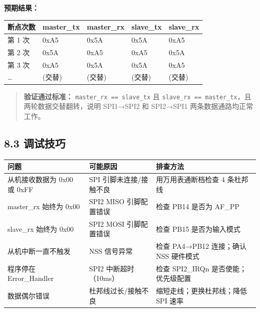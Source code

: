 \documentclass[
  chinese,
  UTF8,
  oneside,
  openany]{ctexbook}
\begin{document}
\textbf{预期结果：}

\begin{longtable}[]{@{}lllll@{}}
\toprule\noalign{}
断点次数 & master\_tx & master\_rx & slave\_tx & slave\_rx \\
\midrule\noalign{}
\endhead
\bottomrule\noalign{}
\endlastfoot
第 1 次 & 0xA5 & 0x5A & 0x5A & 0xA5 \\
第 2 次 & 0x5A & 0xA5 & 0xA5 & 0x5A \\
第 3 次 & 0xA5 & 0x5A & 0x5A & 0xA5 \\
\ldots{} & (交替) & (交替) & (交替) & (交替) \\
\end{longtable}

\begin{quote}
\textbf{验证通过标准：} \texttt{master\_rx\ ==\ slave\_tx} 且
\texttt{slave\_rx\ ==\ master\_tx}，且两轮数据交替翻转，说明 SPI1→SPI2
和 SPI2→SPI1 两条数据通路均正常工作。
\end{quote}

\subsection{8.3 调试技巧}\label{ux8c03ux8bd5ux6280ux5de7-3}

\begin{longtable}[]{@{}
  >{\raggedright\arraybackslash}p{}
  >{\raggedright\arraybackslash}p{}
  >{\raggedright\arraybackslash}p{}@{}}
\toprule\noalign{}
\begin{minipage}[b]{\linewidth}\raggedright
问题
\end{minipage} & \begin{minipage}[b]{\linewidth}\raggedright
可能原因
\end{minipage} & \begin{minipage}[b]{\linewidth}\raggedright
排查方法
\end{minipage} \\
\midrule\noalign{}
\endhead
\bottomrule\noalign{}
\endlastfoot
从机接收数据为 0x00 或 0xFF & SPI 引脚未连接/接触不良 &
用万用表通断档检查 4 条杜邦线 \\
master\_rx 始终为 0x00 & SPI2 MISO 引脚配置错误 & 检查 PB14 是否为
AF\_PP \\
slave\_rx 始终为 0x00 & SPI2 MOSI 引脚配置错误 & 检查 PB15
是否为输入模式 \\
从机中断一直不触发 & NSS 信号异常 & 检查 PA4→PB12 连接；确认 NSS
硬件模式 \\
程序停在 Error\_Handler & SPI2 中断超时（10ms） & 检查 SPI2\_IRQn
是否使能；优先级配置 \\
数据偶尔错误 & 杜邦线过长/接触不良 & 缩短走线；更换杜邦线；降低 SPI
速率 \\
\end{longtable}
\end{document}
